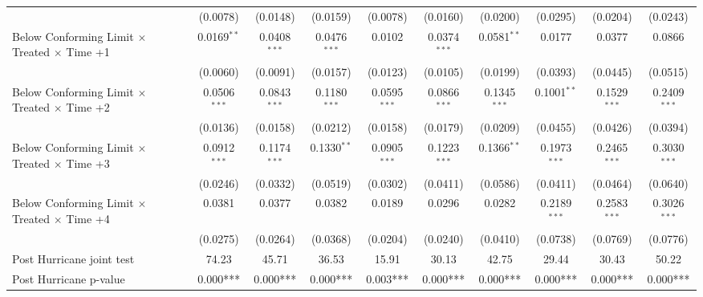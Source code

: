\begin{tabular}{lccccccccc}
                                                              & (0.0078)       & (0.0148)       & (0.0159)       & (0.0078)       & (0.0160)       & (0.0200)       & (0.0295)       & (0.0204)       & (0.0243)\\   
   Below Conforming Limit $\times$ Treated $\times$ Time +1   & 0.0169$^{**}$  & 0.0408$^{***}$ & 0.0476$^{***}$ & 0.0102         & 0.0374$^{***}$ & 0.0581$^{**}$  & 0.0177         & 0.0377         & 0.0866\\   
                                                              & (0.0060)       & (0.0091)       & (0.0157)       & (0.0123)       & (0.0105)       & (0.0199)       & (0.0393)       & (0.0445)       & (0.0515)\\   
   Below Conforming Limit $\times$ Treated $\times$ Time +2   & 0.0506$^{***}$ & 0.0843$^{***}$ & 0.1180$^{***}$ & 0.0595$^{***}$ & 0.0866$^{***}$ & 0.1345$^{***}$ & 0.1001$^{**}$  & 0.1529$^{***}$ & 0.2409$^{***}$\\   
                                                              & (0.0136)       & (0.0158)       & (0.0212)       & (0.0158)       & (0.0179)       & (0.0209)       & (0.0455)       & (0.0426)       & (0.0394)\\   
   Below Conforming Limit $\times$ Treated $\times$ Time +3   & 0.0912$^{***}$ & 0.1174$^{***}$ & 0.1330$^{**}$  & 0.0905$^{***}$ & 0.1223$^{***}$ & 0.1366$^{**}$  & 0.1973$^{***}$ & 0.2465$^{***}$ & 0.3030$^{***}$\\   
                                                              & (0.0246)       & (0.0332)       & (0.0519)       & (0.0302)       & (0.0411)       & (0.0586)       & (0.0411)       & (0.0464)       & (0.0640)\\   
   Below Conforming Limit $\times$ Treated $\times$ Time +4   & 0.0381         & 0.0377         & 0.0382         & 0.0189         & 0.0296         & 0.0282         & 0.2189$^{***}$ & 0.2583$^{***}$ & 0.3026$^{***}$\\   
                                                              & (0.0275)       & (0.0264)       & (0.0368)       & (0.0204)       & (0.0240)       & (0.0410)       & (0.0738)       & (0.0769)       & (0.0776)\\   
   Post Hurricane joint test                                  & 74.23          & 45.71          & 36.53          & 15.91          & 30.13          & 42.75          & 29.44          & 30.43          & 50.22\\  
   Post Hurricane p-value                                     & 0.000***       & 0.000***       & 0.000***       & 0.003***       & 0.000***       & 0.000***       & 0.000***       & 0.000***       & 0.000***\\  

\end{tabular}
